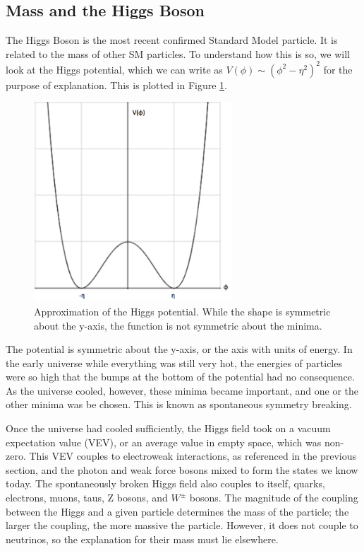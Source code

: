 \subsection{Mass and the Higgs Boson}
The Higgs Boson is the most recent confirmed Standard Model particle. It is related to the mass of other SM particles. To understand how this is so, we will look at the Higgs potential, which we can write as $V(\phi) \sim (\phi^2 - \eta^2)^2$ for the purpose of explanation. This is plotted in Figure \ref{Fig:Intro:HiggsPot}.
\begin{figure}[h]
    \centering
        \includegraphics[width=0.66\textwidth]{F1/higgspot.png}
        \caption{Approximation of the Higgs potential. While the shape is symmetric about the y-axis, the function is not symmetric about the minima.}
        \label{Fig:Intro:HiggsPot}
\end{figure}
The potential is symmetric about the y-axis, or the axis with units of energy. In the early universe while everything was still very hot, the energies of particles were so high that the bumps at the bottom of the potential had no consequence. As the universe cooled, however, these minima became important, and one or the other minima was be chosen. This is known as spontaneous symmetry breaking.

Once the universe had cooled sufficiently, the Higgs field took on a vacuum expectation value (VEV), or an average value in empty space, which was non-zero. This VEV couples to electroweak interactions, as referenced in the previous section, and the photon and weak force bosons mixed to form the states we know today. The spontaneously broken Higgs field also couples to itself, quarks, electrons, muons, taus, Z bosons, and $W^{\pm}$ bosons. The magnitude of the coupling between the Higgs and a given particle determines the mass of the particle; the larger the coupling, the more massive the particle. However, it does not couple to neutrinos, so the explanation for their mass must lie elsewhere.

